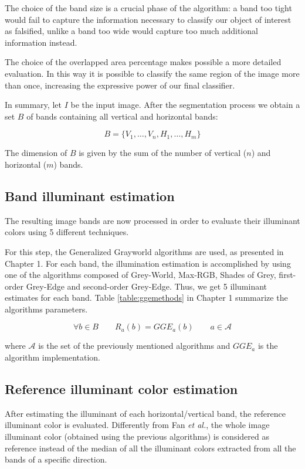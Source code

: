 The choice of the band size is a crucial phase of the algorithm: a band too tight would fail to capture the information necessary to classify our object of interest as falsified, unlike a band too wide would capture too much additional information instead.

The choice of the overlapped area percentage makes possible a more detailed evaluation. In this way it is possible to classify the same region of the image more than once, increasing the expressive power of our final classifier.
 
In summary, let $I$ be the input image. After the segmentation process we obtain a set $B$ of bands containing all vertical and horizontal bands:

$$
B = \{V_1, \ldots, V_n, H_1, \ldots, H_m\}
$$

The dimension of $B$ is given by the sum of the number of vertical ($n$) and horizontal ($m$) bands.

\subsection{Band illuminant estimation}

The resulting image bands are now processed in order to evaluate their illuminant colors using 5 different techniques.

For this step, the Generalized Grayworld \cite{van2007edge} algorithms are used, as presented in Chapter 1. For each band, the illumination estimation is accomplished by using one of the algorithms composed of Grey-World, Max-RGB, Shades of Grey, first-order Grey-Edge and second-order Grey-Edge. Thus, we get 5 illuminant estimates for each band.
Table \ref{table:ggemethods} in Chapter 1 summarize the algorithms parameters.

$$
\forall b \in B \qquad R_a(b) = GGE_a(b) \qquad a \in \mathcal{A}
$$

where $\mathcal{A}$ is the set of the previously mentioned algorithms and $GGE_a$ is the algorithm implementation.

\subsection{Reference illuminant color estimation}

After estimating the illuminant of each horizontal/vertical band, the reference illuminant color is evaluated. Differently from Fan \emph{et al.}\cite{fan2015image}, the whole image illuminant color (obtained using the previous algorithms) is considered as reference instead of the median of all the illuminant colors extracted from all the bands of a specific direction. 

